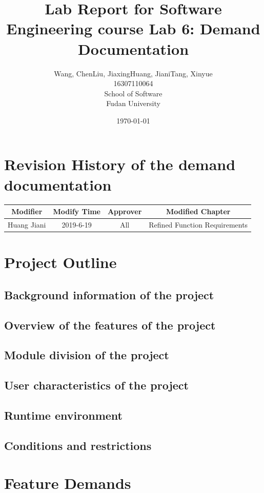 \documentclass[a4paper]{report}
\title{Lab Report for Software Engineering course \newline
 Lab 6: Demand Documentation}
\author{Wang, Chen\qquad Liu, Jiaxing\qquad Huang, Jiani\qquad Tang, Xinyue \\
16307110064\qquad17302010049\qquad 17302010063\qquad 16307110476 \\
School of Software\\
Fudan University
}
\date{\today}
\begin{document}
\maketitle

\tableofcontents
\chapter{Revision History of the demand documentation}

\begin{tabular}{|c|c|c|c|} 
\hline 
Modifier&Modify Time&Approver&Modified Chapter\\
\hline  
Huang Jiani&2019-6-19&All&Refined Function Requirements\\
\hline 
\end{tabular}

\chapter{Project Outline}
\section{Background information of the project}

\section{Overview of the features of the project}

\section{Module division of the project}

\section{User characteristics of the project}

\section{Runtime environment}

\section{Conditions and restrictions}

\chapter{Feature Demands}
\end{document}
